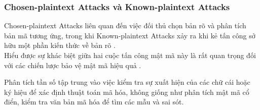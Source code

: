 \subsubsection{Chosen-plaintext Attacks và Known-plaintext Attacks}
Chosen-plaintext Attacks liên quan đến việc đối thủ chọn bản rõ và phân tích bản mã tương ứng, trong khi Known-plaintext Attacks xảy ra khi kẻ tấn công sở hữu một phần kiến thức về bản rõ \cite{hoang-2023}.\\
Hiểu được sự khác biệt giữa hai cuộc tấn công mật mã này là rất quan trọng đối với các chiến lược bảo vệ mật mã hiệu quả \cite{hoang-2023}.
\begin{table}[H]
\end{table}
Phân tích tần số tập trung vào việc kiểm tra sự xuất hiện của các chữ cái hoặc ký hiệu để xác định thuật toán mã hóa, không giống như phân tích mật mã cổ điển, kiểm tra văn bản mã hóa để tìm các mẫu và sai sót.
